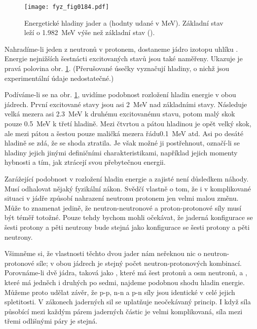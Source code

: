     \begin{figure}[ht!]  %
      \centering
      \texttt{[image: fyz\_fig0184.pdf]}
      \caption{Energetické hladiny jader  a  (hodnty udané v
              \si{\mega\electronvolt}). Základní stav  leží o
              \SI{1.982}{\mega\electronvolt} výše než základní stav 
              (\cite[s.~149]{Feynman02}).}
      \label{fyz:fig0184}
    \end{figure}

    Nahradíme-li jeden z neutronů v  protonem, dostaneme jádro izotopu uhlíku .
    Energie nejnižších šestnácti excitovaných stavů  jsou také naměřeny. Ukazuje je pravá
    polovina obr. \ref{fyz:fig0184}. (Přerušované úsečky vyznačují hladiny, o nichž jsou
    experimentální údaje nedostatečné.)

    Podíváme-li se na obr. \ref{fyz:fig0184}, uvidíme podobnost rozložení hladin energie v obou
    jádrech. První excitované stavy jsou asi \SI{2}{\mega\electronvolt} nad základními stavy.
    Následuje velká mezera asi \SI{2.3}{\mega\electronvolt} k druhému excitovanému stavu, potom malý
    skok pouze \SI{0.5}{\mega\electronvolt} k třetí hladině. Mezi čtvrtou a pátou hladinou je opět
    velký skok, ale mezi pátou a šestou pouze maličká mezera řádu\SI{0.1}{\mega\electronvolt} atd.
    Asi po desáté hladině se zdá, že se shoda ztratila. Je však možné ji postřehnout, označí-li se
    hladiny jejich jinými definičními charakteristikami, například jejich momenty hybnosti a tím,
    jak ztrácejí svou přebytečnou energii.

    Zarážející podobnost v rozložení hladin energie  a  zajisté není důsledkem
    náhody. Musí odhalovat nějaký fyzikální zákon. Svědčí vlastně o tom, že i v komplikované situaci
    v jádře způsobí nahrazení neutronu protonem jen velmi malou změnu. Může to znamenat jedině, že
    neutron-neutronové a proton-protonové síly musí být téměř totožné. Pouze tehdy bychom mohli
    očekávat, že jaderná konfigurace se šesti protony a pěti neutrony bude stejná jako konfigurace
    se šesti protony a pěti neutrony.

    Všimněme si, že vlastnosti těchto dvou jader nám neřeknou nic o neutron-protonové síle; v obou
    jádrech je stejný počet neutron-protonových kombinací. Porovnáme-li dvě jádra, taková jako
    , které má šest protonů a osm neutronů, a , které má jedněch i druhých po
    sedmi, najdeme podobnou shodu hladin energie. Můžeme proto udělat závěr, že p-p, n-n a p-n síly
    jsou identické v celé jejich spletitosti. V zákonech jaderných sil se uplatňuje neočekávaný
    princip. I když síla působící mezi každým párem jaderných částic je velmi komplikovaná, síla
    mezi třemi odlišnými páry je stejná.

